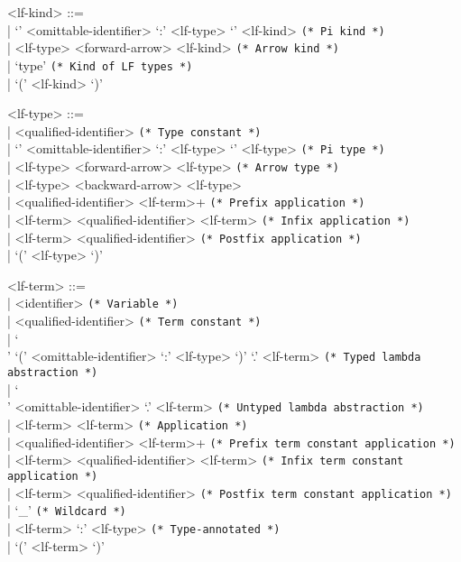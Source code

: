 \documentclass[11pt]{article}
\begin{document}
\begin{grammar}
<lf-kind> ::= \hfill\\
| `{' <omittable-identifier> `:' <lf-type> `}' <lf-kind> \hfill \texttt{(* Pi kind *)}\\
| <lf-type> <forward-arrow> <lf-kind> \hfill \texttt{(* Arrow kind *)}\\
| `type' \hfill \texttt{(* Kind of LF types *)}\\
| `(' <lf-kind> `)'

<lf-type> ::= \hfill\\
| <qualified-identifier> \hfill \texttt{(* Type constant *)}\\
| `{' <omittable-identifier> `:' <lf-type> `}' <lf-type> \hfill \texttt{(* Pi type *)}\\
| <lf-type> <forward-arrow> <lf-type> \hfill \texttt{(* Arrow type *)}\\
| <lf-type> <backward-arrow> <lf-type>\\
| <qualified-identifier> <lf-term>+ \hfill \texttt{(* Prefix application *)}\\
| <lf-term> <qualified-identifier> <lf-term> \hfill \texttt{(* Infix application *)}\\
| <lf-term> <qualified-identifier> \hfill \texttt{(* Postfix application *)}\\
| `(' <lf-type> `)'

<lf-term> ::= \hfill\\
| <identifier> \hfill \texttt{(* Variable *)}\\
| <qualified-identifier> \hfill \texttt{(* Term constant *)}\\
| `\\' `(' <omittable-identifier> `:' <lf-type> `)' `.' <lf-term> \hfill \texttt{(* Typed lambda abstraction *)}\\
| `\\' <omittable-identifier> `.' <lf-term> \hfill \texttt{(* Untyped lambda abstraction *)}\\
| <lf-term> <lf-term> \hfill \texttt{(* Application *)}\\
| <qualified-identifier> <lf-term>+ \hfill \texttt{(* Prefix term constant application *)}\\
| <lf-term> <qualified-identifier> <lf-term> \hfill \texttt{(* Infix term constant application *)}\\
| <lf-term> <qualified-identifier> \hfill \texttt{(* Postfix term constant application *)}\\
| `_' \hfill \texttt{(* Wildcard *)}\\
| <lf-term> `:' <lf-type> \hfill \texttt{(* Type-annotated *)}\\
| `(' <lf-term> `)'
\end{grammar}
\end{document}
